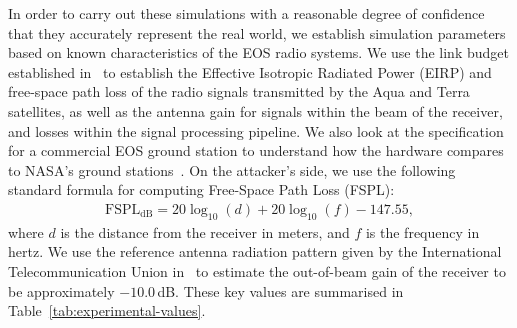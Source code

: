 In order to carry out these simulations with a reasonable degree of confidence that they accurately represent the real world, we establish simulation parameters based on known characteristics of the EOS radio systems.
We use the link budget established in~\cite{quinnNew2003} to establish the Effective Isotropic Radiated Power (EIRP) and free-space path loss of the radio signals transmitted by the Aqua and Terra satellites, as well as the antenna gain for signals within the beam of the receiver, and losses within the signal processing pipeline.
We also look at the specification for a commercial EOS ground station to understand how the hardware compares to NASA's ground stations~\cite{dartcomsystemsltdXBand2021}.
On the attacker's side, we use the following standard formula for computing Free-Space Path Loss (FSPL):
\begin{align}
    \text{FSPL}_{\text{dB}} = 20\log_{10}(d) + 20\log_{10}(f) - 147.55, \label{eq:fspl}
\end{align}
where $d$ is the distance from the receiver in meters, and $f$ is the frequency in hertz.
We use the reference antenna radiation pattern given by the International Telecommunication Union in~\cite{itu2022antenna} to estimate the out-of-beam gain of the receiver to be approximately $-10.0$\,dB.
These key values are summarised in Table~\ref{tab:experimental-values}.

\begin{table}
    \caption{Key values used in overshadowing simulations.}
    \label{tab:experimental-values}
\end{table}

